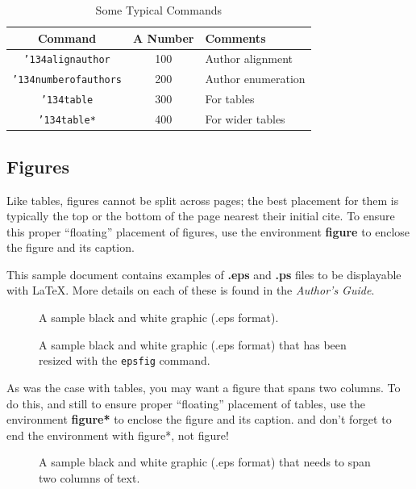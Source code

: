 \documentclass{sig-alternate}
\begin{document}
	
	\begin{table}
		\centering
		\caption{Some Typical Commands}
		\begin{tabular}{|c|c|l|} \hline
			Command&A Number&Comments\\ \hline
			\texttt{{\char'134}alignauthor} & 100& Author alignment\\ \hline
			\texttt{{\char'134}numberofauthors}& 200& Author enumeration\\ \hline
			\texttt{{\char'134}table}& 300 & For tables\\ \hline
			\texttt{{\char'134}table*}& 400& For wider tables\\ \hline\end{tabular}
	\end{table}
	
	\subsection{Figures}
	Like tables, figures cannot be split across pages; the
	best placement for them
	is typically the top or the bottom of the page nearest
	their initial cite.  To ensure this proper ``floating'' placement
	of figures, use the environment
	\textbf{figure} to enclose the figure and its caption.
	
	This sample document contains examples of \textbf{.eps}
	and \textbf{.ps} files to be displayable with \LaTeX.  More
	details on each of these is found in the \textit{Author's Guide}.
	
	\begin{figure}
		\centering
		\caption{A sample black and white graphic (.eps format).}
	\end{figure}
	
	\begin{figure}
		\centering
		\caption{A sample black and white graphic (.eps format)
			that has been resized with the \texttt{epsfig} command.}
	\end{figure}
	
	
	As was the case with tables, you may want a figure
	that spans two columns.  To do this, and still to
	ensure proper ``floating'' placement of tables, use the environment
	\textbf{figure*} to enclose the figure and its caption.
	and don't forget to end the environment with
	{figure*}, not {figure}!
	
	\begin{figure}
		\centering
		\caption{A sample black and white graphic (.eps format)
			that needs to span two columns of text.}
	\end{figure}
	
\end{document}
